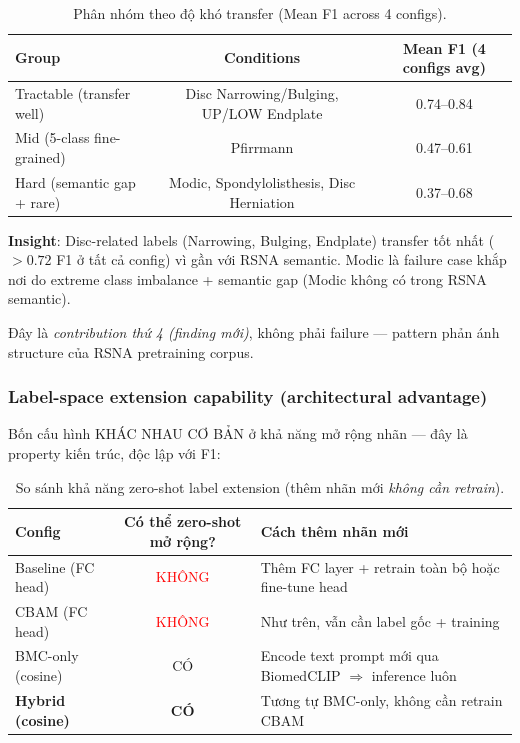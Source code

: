 \documentclass[11pt,a4paper]{article}
\newcommand{\best}[1]{\textcolor{best}{\textbf{#1}}}
\begin{document}
\begin{table}[h]
\centering
\caption{Phân nhóm theo độ khó transfer (Mean F1 across 4 configs).}
\label{tab:spider_selective_transfer}
\begin{tabular}{@{}lcc@{}}
\toprule
\rowcolor{tablehdr}
Group & Conditions & Mean F1 (4 configs avg) \\
\midrule
Tractable (transfer well) & Disc Narrowing/Bulging, UP/LOW Endplate & 0.74--0.84 \\
Mid (5-class fine-grained) & Pfirrmann & 0.47--0.61 \\
Hard (semantic gap + rare) & Modic, Spondylolisthesis, Disc Herniation & 0.37--0.68 \\
\bottomrule
\end{tabular}
\end{table}

\noindent\textbf{Insight}: Disc-related labels (Narrowing, Bulging,
Endplate) transfer tốt nhất ($>0.72$ F1 ở tất cả config) vì gần với
RSNA semantic. Modic là failure case khắp nơi do extreme class
imbalance + semantic gap (Modic không có trong RSNA semantic).

\noindent Đây là \emph{contribution thứ 4 (finding mới)}, không phải
failure --- pattern phản ánh structure của RSNA pretraining corpus.

\subsubsection*{Label-space extension capability (architectural advantage)}

\noindent Bốn cấu hình KHÁC NHAU CƠ BẢN ở khả năng mở rộng nhãn ---
đây là property kiến trúc, độc lập với F1:

\begin{table}[h]
\centering
\caption{So sánh khả năng zero-shot label extension (thêm nhãn mới
\emph{không cần retrain}).}
\label{tab:label_extension_capability}
\small
\begin{tabular}{@{}lcl@{}}
\toprule
\rowcolor{tablehdr}
Config & Có thể zero-shot mở rộng? & Cách thêm nhãn mới \\
\midrule
Baseline (FC head)  & \textcolor{red}{KHÔNG}  & Thêm FC layer + retrain toàn bộ hoặc fine-tune head \\
CBAM (FC head)      & \textcolor{red}{KHÔNG}  & Như trên, vẫn cần label gốc + training \\
BMC-only (cosine)   & \textcolor{green!60!black}{CÓ} & Encode text prompt mới qua BiomedCLIP $\Rightarrow$ inference luôn \\
\best{Hybrid (cosine)} & \textcolor{green!60!black}{\textbf{CÓ}} & Tương tự BMC-only, không cần retrain CBAM \\
\bottomrule
\end{tabular}
\end{table}
\end{document}
